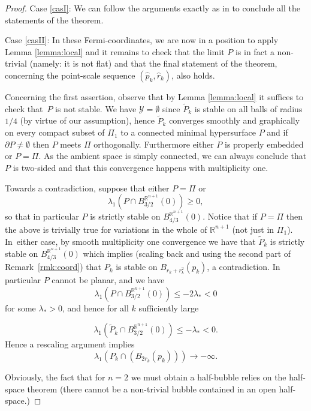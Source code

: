\documentclass[10pt]{amsart}
\let\mathcal\mathscr
\newcounter{cas}
\theoremstyle{definition}
\newcommand{\R}{\mathbb{R}}
\begin{document}
\begin{proof}

Case \ref{casI}: We can follow the arguments exactly as in \cite[Cor.\,2.6]{BS17} to conclude all the statements of the theorem.

Case \ref{casII}:
In these Fermi-coordinates, we are now in a position to apply Lemma \ref{lemma:local} and it remains to check that the limit $P$ is in fact a non-trivial (namely: it is not flat) and that the final statement of the theorem, concerning the point-scale sequence $(\widehat{p}_k,\widehat{r}_k)$, also holds.

Concerning the first assertion, observe that by Lemma \ref{lemma:local} it suffices to check that~$P$ is not stable.
We have $\mathcal{Y}=\emptyset$ since $\widetilde{P}_k$ is stable on all balls of radius $1/4$ (by virtue of our assumption), hence $\widetilde{P}_k$ converges smoothly and graphically on every compact subset of $\Pi_1$ to a connected minimal hypersurface $P$ and if $\partial P\neq\emptyset$ then $P$ meets $\Pi$ orthogonally. Furthermore either $P$ is properly embedded or $P=\Pi$.
As the ambient space is simply connected, we can always conclude that $P$ is two-sided and that this convergence happens with multiplicity one.

Towards a contradiction, suppose that either $P=\Pi$ or
$$\lambda_1(P\cap B^{\R^{n+1}}_{3/2}(0))\geq 0,$$ so that in particular $P$ is strictly stable on $B^{\R^{n+1}}_{4/3}(0)$. Notice that if $P=\Pi$ then the above is trivially true for variations in the whole of $\R^{n+1}$ (\ie not just in $\Pi_1$). In~either case, by smooth multiplicity one convergence we have that $\widetilde{P}_k$ is strictly stable on $B^{\R^{n+1}}_{4/3}(0)$ which implies (scaling back and using the second part of Remark~\ref{rmk:coord}) that $P_k$ is stable on $B_{r_k + r_k^2}(p_k)$, a contradiction. In particular $P$ cannot be planar, and we have
$$\lambda_1(P\cap B^{\R^{n+1}}_{3/2}(0))\leq -2\lambda_{\ast} < 0$$ for some $\lambda_{\ast}>0$, and hence for all $k$ sufficiently large

$$\lambda_1(\widetilde{P}_k\cap B^{\R^{n+1}}_{3/2}(0))\leq -\lambda_{\ast}<0.$$
Hence a rescaling argument implies $$\lambda_1(P_k \cap (B_{2r_k}(p_k)))\to -\infty.$$

Obviously, the fact that for $n=2$ we must obtain a half-bubble relies on the half-space theorem \cite{HM90} (\ie there cannot be a non-trivial bubble contained in an open half-space.)


\end{proof}
\end{document}
